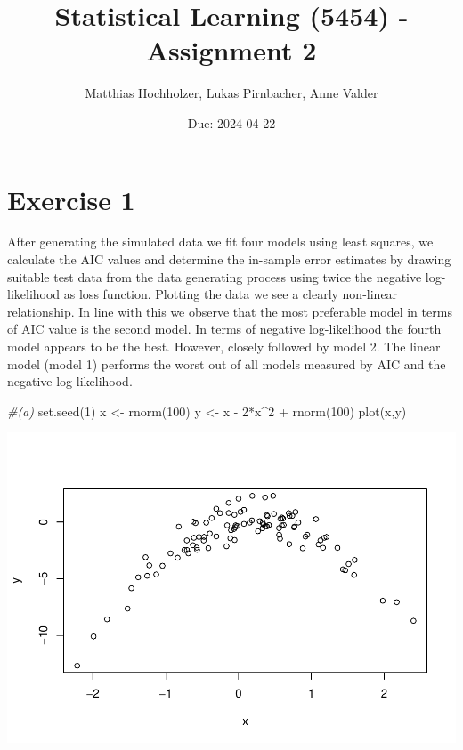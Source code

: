 \documentclass[
]{article}
\title{Statistical Learning (5454) - Assignment 2}
\author{Matthias Hochholzer, Lukas Pirnbacher, Anne Valder}
\date{Due: 2024-04-22}
\newenvironment{Shaded}{\begin{snugshade}}{\end{snugshade}}
\newcommand{\CommentTok}[1]{\textcolor[rgb]{0.56,0.35,0.01}{\textit{#1}}}
\newcommand{\DecValTok}[1]{\textcolor[rgb]{0.00,0.00,0.81}{#1}}
\newcommand{\FunctionTok}[1]{\textcolor[rgb]{0.00,0.00,0.00}{#1}}
\newcommand{\NormalTok}[1]{#1}
\newcommand{\OtherTok}[1]{\textcolor[rgb]{0.56,0.35,0.01}{#1}}
\newcommand{\SpecialCharTok}[1]{\textcolor[rgb]{0.00,0.00,0.00}{#1}}
\begin{document}
\maketitle

\hypertarget{exercise-1}{%
\section{Exercise 1}\label{exercise-1}}

After generating the simulated data we fit four models using least
squares, we calculate the AIC values and determine the in-sample error
estimates by drawing suitable test data from the data generating process
using twice the negative log-likelihood as loss function. Plotting the
data we see a clearly non-linear relationship. In line with this we
observe that the most preferable model in terms of AIC value is the
second model. In terms of negative log-likelihood the fourth model
appears to be the best. However, closely followed by model 2. The linear
model (model 1) performs the worst out of all models measured by AIC and
the negative log-likelihood.

\begin{Shaded}
\begin{Highlighting}[]
\CommentTok{\#(a)}
\FunctionTok{set.seed}\NormalTok{(}\DecValTok{1}\NormalTok{)}
\NormalTok{x }\OtherTok{\textless{}{-}} \FunctionTok{rnorm}\NormalTok{(}\DecValTok{100}\NormalTok{)}
\NormalTok{y }\OtherTok{\textless{}{-}}\NormalTok{ x }\SpecialCharTok{{-}} \DecValTok{2}\SpecialCharTok{*}\NormalTok{x}\SpecialCharTok{\^{}}\DecValTok{2} \SpecialCharTok{+} \FunctionTok{rnorm}\NormalTok{(}\DecValTok{100}\NormalTok{)}
\FunctionTok{plot}\NormalTok{(x,y)}
\end{Highlighting}
\end{Shaded}

\includegraphics{A2_files/figure-latex/unnamed-chunk-3-1.pdf}
\end{document}
